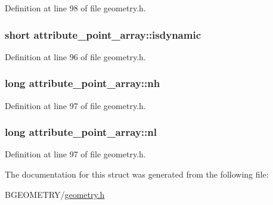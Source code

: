 Definition at line 98 of file geometry.\-h.

\hypertarget{structattribute__point__array_a73e73b0b2d8c28badf5fb14bbde5d6d7}{
\subsubsection[{isdynamic}]{\setlength{\rightskip}{0pt plus 5cm}short attribute\-\_\-point\-\_\-array\-::isdynamic}}\label{structattribute__point__array_a73e73b0b2d8c28badf5fb14bbde5d6d7}


Definition at line 96 of file geometry.\-h.

\hypertarget{structattribute__point__array_ab8acf4ef196e34d03915bb772500eff6}{
\subsubsection[{nh}]{\setlength{\rightskip}{0pt plus 5cm}long attribute\-\_\-point\-\_\-array\-::nh}}\label{structattribute__point__array_ab8acf4ef196e34d03915bb772500eff6}


Definition at line 97 of file geometry.\-h.

\hypertarget{structattribute__point__array_a401844fea269cc945dc58f9b2d527471}{
\subsubsection[{nl}]{\setlength{\rightskip}{0pt plus 5cm}long attribute\-\_\-point\-\_\-array\-::nl}}\label{structattribute__point__array_a401844fea269cc945dc58f9b2d527471}


Definition at line 97 of file geometry.\-h.



The documentation for this struct was generated from the following file\-:\begin{DoxyCompactItemize}
\item 
B\-G\-E\-O\-M\-E\-T\-R\-Y/\hyperlink{geometry_8h}{geometry.\-h}\end{DoxyCompactItemize}
